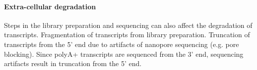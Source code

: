 \paragraph{Extra-cellular degradation} Steps in the library preparation and sequencing can also affect the degradation of transcripts. Fragmentation of transcripts from library preparation. Truncation of transcripts from the 5’ end due to artifacts of nanopore sequencing (e.g. pore blocking). Since polyA+ transcripts are sequenced from the 3’ end, sequencing artifacts result in truncation from the 5’ end.

